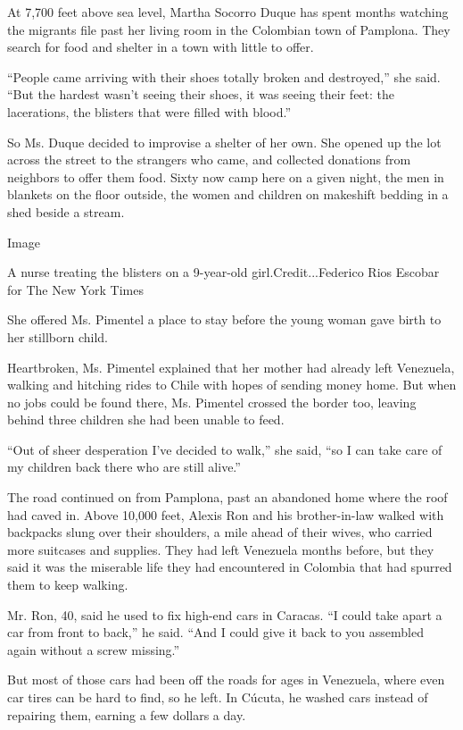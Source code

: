At 7,700 feet above sea level, Martha Socorro Duque has spent months
watching the migrants file past her living room in the Colombian town of
Pamplona. They search for food and shelter in a town with little to
offer.

``People came arriving with their shoes totally broken and destroyed,''
she said. ``But the hardest wasn't seeing their shoes, it was seeing
their feet: the lacerations, the blisters that were filled with blood.''

So Ms. Duque decided to improvise a shelter of her own. She opened up
the lot across the street to the strangers who came, and collected
donations from neighbors to offer them food. Sixty now camp here on a
given night, the men in blankets on the floor outside, the women and
children on makeshift bedding in a shed beside a stream.

Image

A nurse treating the blisters on a 9-year-old girl.Credit...Federico
Rios Escobar for The New York Times

She offered Ms. Pimentel a place to stay before the young woman gave
birth to her stillborn child.

Heartbroken, Ms. Pimentel explained that her mother had already left
Venezuela, walking and hitching rides to Chile with hopes of sending
money home. But when no jobs could be found there, Ms. Pimentel crossed
the border too, leaving behind three children she had been unable to
feed.

``Out of sheer desperation I've decided to walk,'' she said, ``so I can
take care of my children back there who are still alive.''

The road continued on from Pamplona, past an abandoned home where the
roof had caved in. Above 10,000 feet, Alexis Ron and his brother-in-law
walked with backpacks slung over their shoulders, a mile ahead of their
wives, who carried more suitcases and supplies. They had left Venezuela
months before, but they said it was the miserable life they had
encountered in Colombia that had spurred them to keep walking.

Mr. Ron, 40, said he used to fix high-end cars in Caracas. ``I could
take apart a car from front to back,'' he said. ``And I could give it
back to you assembled again without a screw missing.''

But most of those cars had been off the roads for ages in Venezuela,
where even car tires can be hard to find, so he left. In Cúcuta, he
washed cars instead of repairing them, earning a few dollars a day.

